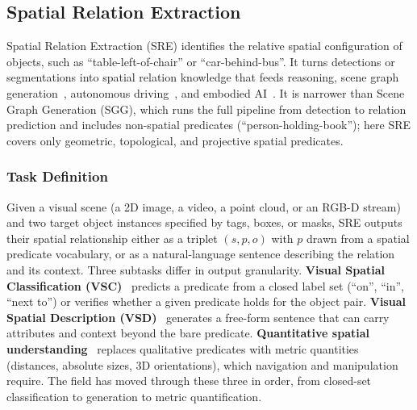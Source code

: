 
\subsection{Spatial Relation Extraction}
\label{sec:spatial_relation_extraction}


%

Spatial Relation Extraction (SRE) identifies the relative spatial configuration of objects, such as ``table-left-of-chair'' or ``car-behind-bus''.
It turns detections or segmentations into spatial relation knowledge that feeds reasoning, scene graph generation~\cite{xu2025llava,li2024pixels,wu2025universal}, autonomous driving~\cite{malawade2022roadscene2vec,zhou2023pit,liu2024edge,liu2025boost}, and embodied AI~\cite{SongBTTSB25,zhang2025vlabench}.
It is narrower than Scene Graph Generation (SGG), which runs the full pipeline from detection to relation prediction and includes non-spatial predicates (``person-holding-book''); here SRE covers only geometric, topological, and projective spatial predicates.


\subsubsection{Task Definition}
Given a visual scene (a 2D image, a video, a point cloud, or an RGB-D stream) and two target object instances specified by tags, boxes, or masks, SRE outputs their spatial relationship either as a triplet $(s, p, o)$ with $p$ drawn from a spatial predicate vocabulary, or as a natural-language sentence describing the relation and its context.
Three subtasks differ in output granularity. \textbf{Visual Spatial Classification (VSC)}~\cite{yang2019spatialsense, zhao2024acm} predicts a predicate from a closed label set (``on'', ``in'', ``next to'') or verifies whether a given predicate holds for the object pair. \textbf{Visual Spatial Description (VSD)}~\cite{zhao2022visual, zhao2023generating} generates a free-form sentence that can carry attributes and context beyond the bare predicate. \textbf{Quantitative spatial understanding}~\cite{cheng2024spatialrgpt,chen2024spatialvlm} replaces qualitative predicates with metric quantities (distances, absolute sizes, 3D orientations), which navigation and manipulation require. The field has moved through these three in order, from closed-set classification to generation to metric quantification.



